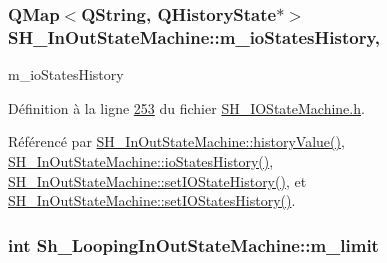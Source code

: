 \hypertarget{classSH__InOutStateMachine_aaca2ea542b3f5b4cd238396b07492455}{
\subsubsection[{m\-\_\-io\-States\-History}]{\setlength{\rightskip}{0pt plus 5cm}Q\-Map$<$Q\-String, Q\-History\-State$\ast$$>$ S\-H\-\_\-\-In\-Out\-State\-Machine\-::m\-\_\-io\-States\-History\hspace{0.3cm}{\ttfamily [protected]}, {\ttfamily [inherited]}}}\label{classSH__InOutStateMachine_aaca2ea542b3f5b4cd238396b07492455}


m\-\_\-io\-States\-History 



Définition à la ligne \hyperlink{SH__IOStateMachine_8h_source_l00253}{253} du fichier \hyperlink{SH__IOStateMachine_8h_source}{S\-H\-\_\-\-I\-O\-State\-Machine.\-h}.



Référencé par \hyperlink{classSH__InOutStateMachine_af71bfdb3b59b7bf2763588b513b4205f}{S\-H\-\_\-\-In\-Out\-State\-Machine\-::history\-Value()}, \hyperlink{classSH__InOutStateMachine_a13889998c6dcd17db984dd6ed1454e80}{S\-H\-\_\-\-In\-Out\-State\-Machine\-::io\-States\-History()}, \hyperlink{classSH__InOutStateMachine_acbcce2c4300af1634d928b30e5e9be1c}{S\-H\-\_\-\-In\-Out\-State\-Machine\-::set\-I\-O\-State\-History()}, et \hyperlink{classSH__InOutStateMachine_af51f92c37d00a4eec4da42113cfd7d73}{S\-H\-\_\-\-In\-Out\-State\-Machine\-::set\-I\-O\-States\-History()}.

\hypertarget{classSh__LoopingInOutStateMachine_a320ece6cf74c2667c70059b9421117fb}{
\subsubsection[{m\-\_\-limit}]{\setlength{\rightskip}{0pt plus 5cm}int Sh\-\_\-\-Looping\-In\-Out\-State\-Machine\-::m\-\_\-limit\hspace{0.3cm}{\ttfamily [private]}}}\label{classSh__LoopingInOutStateMachine_a320ece6cf74c2667c70059b9421117fb}


